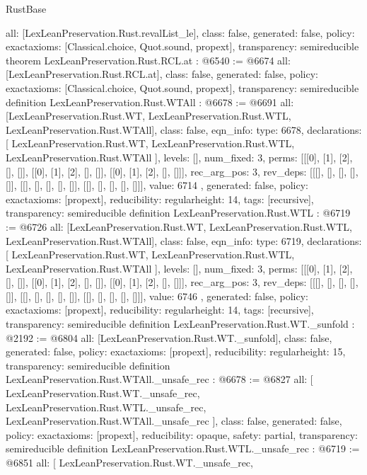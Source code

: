 \begin{lexlean}{RustBase}
\begin{coremodule}
{  all: [LexLeanPreservation.Rust.revalList_le],
  class: false,
  generated: false,
  policy: exact{axioms: [Classical.choice, Quot.sound, propext]},
  transparency: semireducible
}
theorem LexLeanPreservation.Rust.RCL.at : @6540 := @6674 {
  all: [LexLeanPreservation.Rust.RCL.at],
  class: false,
  generated: false,
  policy: exact{axioms: [Classical.choice, Quot.sound, propext]},
  transparency: semireducible
}
definition LexLeanPreservation.Rust.WTAll : @6678 := @6691 {
  all: [LexLeanPreservation.Rust.WT, LexLeanPreservation.Rust.WTL, LexLeanPreservation.Rust.WTAll],
  class: false,
  eqn_info: {
    type: 6678,
    declarations: [
      LexLeanPreservation.Rust.WT,
      LexLeanPreservation.Rust.WTL,
      LexLeanPreservation.Rust.WTAll
    ],
    levels: [],
    num_fixed: 3,
    perms: [[[0], [1], [2], [], []], [[0], [1], [2], [], []], [[0], [1], [2], [], []]],
    rec_arg_pos: 3,
    rev_deps: [[[], [], [], [], []], [[], [], [], [], []], [[], [], [], [], []]],
    value: 6714
  },
  generated: false,
  policy: exact{axioms: [propext]},
  reducibility: regular{height: 14},
  tags: [recursive],
  transparency: semireducible
}
definition LexLeanPreservation.Rust.WTL : @6719 := @6726 {
  all: [LexLeanPreservation.Rust.WT, LexLeanPreservation.Rust.WTL, LexLeanPreservation.Rust.WTAll],
  class: false,
  eqn_info: {
    type: 6719,
    declarations: [
      LexLeanPreservation.Rust.WT,
      LexLeanPreservation.Rust.WTL,
      LexLeanPreservation.Rust.WTAll
    ],
    levels: [],
    num_fixed: 3,
    perms: [[[0], [1], [2], [], []], [[0], [1], [2], [], []], [[0], [1], [2], [], []]],
    rec_arg_pos: 3,
    rev_deps: [[[], [], [], [], []], [[], [], [], [], []], [[], [], [], [], []]],
    value: 6746
  },
  generated: false,
  policy: exact{axioms: [propext]},
  reducibility: regular{height: 14},
  tags: [recursive],
  transparency: semireducible
}
definition LexLeanPreservation.Rust.WT._sunfold : @2192 := @6804 {
  all: [LexLeanPreservation.Rust.WT._sunfold],
  class: false,
  generated: false,
  policy: exact{axioms: [propext]},
  reducibility: regular{height: 15},
  transparency: semireducible
}
definition LexLeanPreservation.Rust.WTAll._unsafe_rec : @6678 := @6827 {
  all: [
    LexLeanPreservation.Rust.WT._unsafe_rec,
    LexLeanPreservation.Rust.WTL._unsafe_rec,
    LexLeanPreservation.Rust.WTAll._unsafe_rec
  ],
  class: false,
  generated: false,
  policy: exact{axioms: [propext]},
  reducibility: opaque{},
  safety: partial,
  transparency: semireducible
}
definition LexLeanPreservation.Rust.WTL._unsafe_rec : @6719 := @6851 {
  all: [
    LexLeanPreservation.Rust.WT._unsafe_rec,
}
\end{coremodule}
\end{lexlean}
